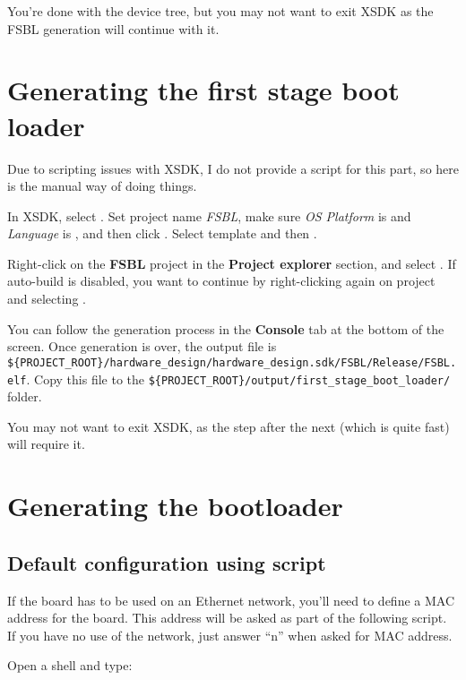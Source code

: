 \documentclass[openany,a4paper]{book}
\begin{document}
You're done with the device tree, but you may not want to exit XSDK as the FSBL generation will continue with it.


\section{Generating the first stage boot loader}

Due to scripting issues with XSDK, I do not provide a script for this part, so here is the manual way of doing things.

In XSDK, select .
Set project name \textit{FSBL}, make sure \textit{OS Platform} is  and \textit{Language} is , and then click .
Select template  and then .

Right-click on the \textbf{FSBL} project in the \textbf{Project explorer} section, and select .
If auto-build is disabled, you want to continue by right-clicking again on project and selecting .

You can follow the generation process in the \textbf{Console} tab at the bottom of the screen.
Once generation is over, the output file is \nolinkurl{${PROJECT_ROOT}/hardware_design/hardware_design.sdk/FSBL/Release/FSBL.elf}.
Copy this file to the \nolinkurl{${PROJECT_ROOT}/output/first_stage_boot_loader/} folder.

You may not want to exit XSDK, as the step after the next (which is quite fast) will require it.


\section{Generating the bootloader}\label{section_bootloader}

\subsection{Default configuration using script}

If the board has to be used on an Ethernet network, you'll need to define a MAC address for the board.
This address will be asked as part of the following script.
If you have no use of the network, just answer ``n'' when asked for MAC address.

Open a shell and type:
\end{document}
